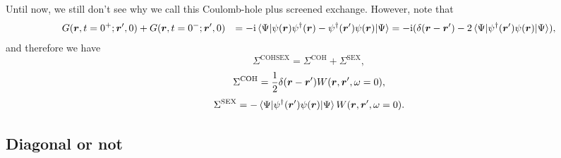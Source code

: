 \documentclass[hyperref, a4paper]{report}
\newcommand*{\ii}{\mathrm{i}}
\def\\{}%
\begin{document}
Until now, we still don't see 
why we call this Coulomb-hole plus screened exchange.
However, note that 
\[
    \begin{aligned}
        &\quad G(\vb*{r}, t = 0^+; \vb*{r}', 0) + 
        G(\vb*{r}, t = 0^-; \vb*{r}', 0) \\
        &= - \ii \expval*{\psi(\vb*{r}) \psi^\dagger(\vb*{r}) - \psi^\dagger(\vb*{r}') \psi(\vb*{r})}{\Psi} \\
        &= - \ii (\delta(\vb*{r} - \vb*{r}') - 
        2 \expval*{\psi^\dagger(\vb*{r}') \psi(\vb*{r})}{\Psi}),
    \end{aligned}
\]
and therefore we have 
\begin{equation}
    \Sigma^{\text{COHSEX}} = \Sigma^{\text{COH}} + \Sigma^{\text{SEX}},
\end{equation}
\begin{equation}
    \Sigma^{\text{COH}} = \frac{1}{2} \delta(\vb*{r} - \vb*{r}') 
    W(\vb*{r}, \vb*{r}', \omega = 0), 
\end{equation}
\begin{equation}
    \Sigma^{\text{SEX}} = - \expval*{\psi^\dagger(\vb*{r}') \psi(\vb*{r})}{\Psi}
    W(\vb*{r}, \vb*{r}', \omega = 0).
\end{equation}


\subsection{Diagonal or not}
\end{document}
